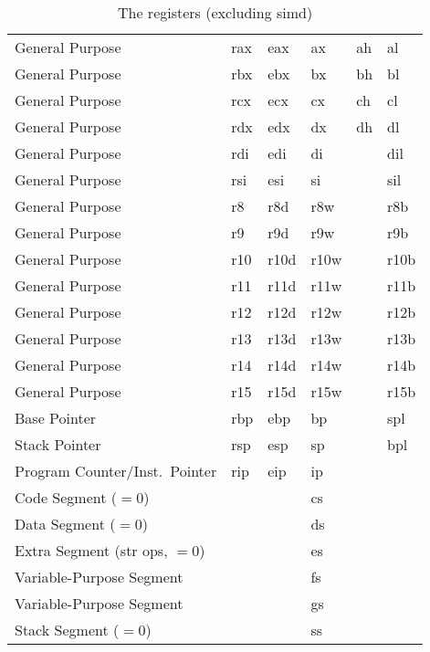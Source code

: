 \begin{table*}
  \centering
  \appto\theadfont{\normalcolor\normalfont}
  \caption{The  registers (excluding \acs*{simd})}\label{tbl:regs}
  \begin{threeparttable}
    \begin{tabular}{lAAAAA}
      \toprule
       &  &  &
       &  &  \\
      \midrule
      General Purpose & rax & eax & ax & ah & al \\
      General Purpose & rbx & ebx & bx & bh & bl \\
      General Purpose & rcx & ecx & cx & ch & cl \\
      General Purpose & rdx & edx & dx & dh & dl \\
      General Purpose & rdi & edi & di && dil \\
      General Purpose & rsi & esi & si && sil \\
      General Purpose & r8 & r8d & r8w && r8b \\
      General Purpose & r9 & r9d & r9w && r9b \\
      General Purpose & r10 & r10d & r10w && r10b \\
      General Purpose & r11 & r11d & r11w && r11b \\
      General Purpose & r12 & r12d & r12w && r12b \\
      General Purpose & r13 & r13d & r13w && r13b \\
      General Purpose & r14 & r14d & r14w && r14b \\
      General Purpose & r15 & r15d & r15w && r15b \\
      Base Pointer & rbp & ebp & bp && spl \\
      Stack Pointer & rsp & esp & sp && bpl \\
      Program Counter/Inst.\ Pointer & rip & eip & ip && \\
      Code Segment ($=0$) &&& cs && \\
      Data Segment ($=0$) &&& ds && \\
      Extra Segment (str ops, $=0$) &&& es && \\
      Variable-Purpose Segment &&& fs && \\
      Variable-Purpose Segment &&& gs && \\
      Stack Segment ($=0$) &&& ss && \\

\end{tabular}
\end{threeparttable}
\end{table*}
